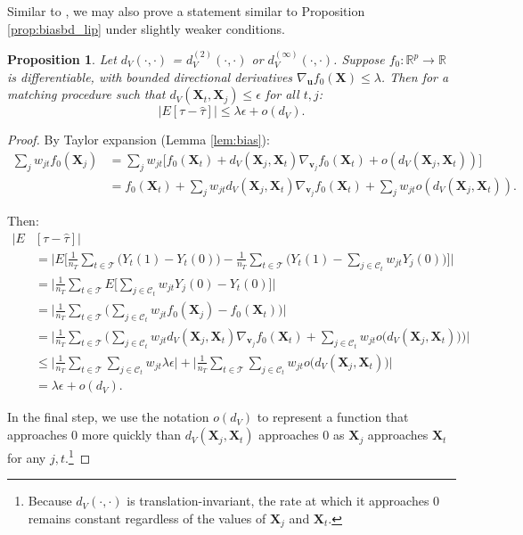 \documentclass{article}
\newtheorem{proposition}[theorem]{Proposition}
\newcommand{\Xt}{\mathbf{X}_t}
\newcommand{\Xj}{\mathbf{X}_j}
\newcommand{\vj}{\mathbf{v}_j}
\newcommand{\R}{\mathbb{R}}
\newcommand{\Rp}{\mathbb{R}^p}
\newcommand{\Ct}{\mathcal{C}_{t}}
\begin{document}
Similar to \citet{iacus2011multivariate}, we may also prove a statement similar to Proposition \ref{prop:biasbd_lip} under slightly weaker conditions.
\begin{proposition}
Let $d_V(\cdot, \cdot)$ = $d^{(2)}_V(\cdot, \cdot)$ or $d^{(\infty)}_V(\cdot, \cdot)$.
Suppose $f_0: \Rp \to \R$ is differentiable, with bounded directional derivatives $\nabla_{\mathbf{u}} f_0(\mathbf{X}) \leq \lambda$.
Then for a matching procedure such that $d_V(\Xt, \Xj) \leq \epsilon$ for all $t,j$:
\begin{equation*}
\label{prop:biasbd_diff}
    \big|E[\tau - \hat{\tau}] \big| \leq \lambda \epsilon + o(d_V).
\end{equation*}
\end{proposition}
\begin{proof}
    By Taylor expansion (Lemma \ref{lem:bias}):
    \begin{align*}
        \sum_j w_{jt} f_0(\Xj)
        &= \sum_j w_{jt} \Big[ f_0(\Xt) + d_V(\Xj, \Xt) \nabla_{\vj} f_0(\Xt) + o(d_V(\Xj, \Xt)) \Big] \\
        &= f_0(\Xt) + \sum_j w_{jt} d_V(\Xj, \Xt) \nabla_{\vj} f_0(\Xt) + \sum_j w_{jt} o(d_V(\Xj, \Xt)).
    \end{align*}

    Then:
    \begin{align*}
        \big| E &[\tau - \hat{\tau} ] \big| \\
        &= \bigg| E\Big[\frac{1}{n_T}\sum_{t \in \mathcal{T}} \big( Y_t(1) - Y_t(0) \big) - \frac{1}{n_T}\sum_{t \in \mathcal{T}} \big( Y_t(1) - \sum_{j \in \Ct} w_{jt} Y_j(0) \big) \Big] \bigg| \\
        &= \bigg| \frac{1}{n_T} \sum_{t \in \mathcal{T}} 
            E\Big[ \sum_{j \in \Ct} w_{jt} Y_j(0) - Y_t(0) \Big]\bigg| \\
        &= \bigg| \frac{1}{n_T} \sum_{t \in \mathcal{T}} 
            \Big( \sum_{j \in \Ct} w_{jt} f_0(\Xj) - f_0(\Xt) \Big) \bigg| \\
        &= \bigg| \frac{1}{n_T} \sum_{t \in \mathcal{T}} 
            \Big( \sum_{j \in \Ct} w_{jt} d_V(\Xj, \Xt) \nabla_{\vj} f_0(\Xt) 
            + \sum_{j \in \Ct} w_{jt} o\big(d_V(\Xj, \Xt)\big) \Big) \bigg| \\
        &\leq \bigg| \frac{1}{n_T} \sum_{t \in \mathcal{T}} 
            \sum_{j \in \Ct} w_{jt} \lambda \epsilon \bigg|
            + \bigg| \frac{1}{n_T} \sum_{t \in \mathcal{T}} \sum_{j \in \Ct} w_{jt} o\big(d_V(\Xj, \Xt)\big) \bigg| \\
        &= \lambda \epsilon + o(d_V).
    \end{align*}

    In the final step, we use the notation $o(d_V)$ to represent a function that approaches 0 more quickly than $d_V(\Xj, \Xt)$ approaches 0 as $\Xj$ approaches $\Xt$ for any $j, t$.\footnote{Because $d_V(\cdot, \cdot)$ is translation-invariant, the rate at which it approaches 0 remains constant regardless of the values of $\Xj$ and $\Xt$.}
\end{proof}
\end{document}
